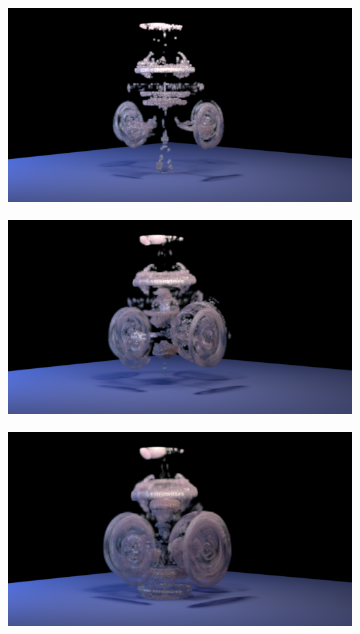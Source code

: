 \documentclass[11pt]{article}
\begin{document}
\begin{figure}
	\begin{subfigure}[h]{0.5\textwidth}
		\centering
		\includegraphics[width=\textwidth]{Figures/renders/plume0008.png}
	\end{subfigure}
	\begin{subfigure}[h]{0.5\textwidth}
		\centering
		\includegraphics[width=\textwidth]{Figures/renders/plume0009.png}
	\end{subfigure}
	\begin{subfigure}[h]{0.5\textwidth}
		\centering
		\includegraphics[width=\textwidth]{Figures/renders/plume0010.png}

\end{subfigure}
\end{figure}
\end{document}

